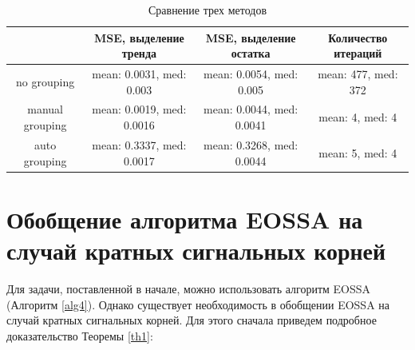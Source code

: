 \documentclass[specialist,
               substylefile = spbu_report.rtx,
               subf,href,colorlinks=true, 12pt]{disser}
\theoremstyle{definition}
\begin{document}
\begin{table}[h]
\footnotesize
\caption{Сравнение трех методов}
\label{tabular:2}
\begin{center}
\begin{tabular}{|c | c| c| c|}
\hline
 & MSE, выделение тренда & MSE, выделение остатка & Количество итераций \\
\hline
no grouping & mean: 0.0031, med: 0.003 & mean: 0.0054, med: 0.005 &
mean: 477, med: 372 \\
manual grouping & mean: 0.0019, med: 0.0016 & mean: 0.0044, med: 0.0041
& mean: 4, med: 4 \\
auto grouping & mean: 0.3337, med: 0.0017 & mean: 0.3268, med: 0.0044 &
mean: 5, med: 4 \\
\hline
\end{tabular}
\end{center}
\end{table}

\chapter{Обобщение алгоритма EOSSA на случай кратных сигнальных корней}
Для задачи, поставленной в начале, можно использовать алгоритм EOSSA (Алгоритм \ref{alg4}). Однако существует необходимость в обобщении EOSSA на случай кратных сигнальных корней. Для этого сначала приведем подробное доказательство Теоремы \ref{th1}:
\end{document}

